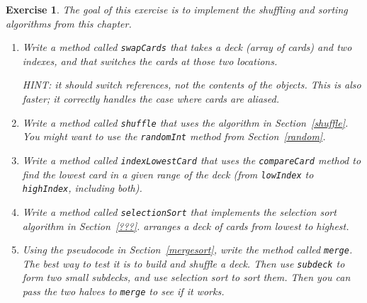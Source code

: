 \documentclass[12pt]{book}
\theoremstyle{exercise}
\newtheorem{exercise}{Exercise}[chapter]
\newcommand{\java}[1]{\verb"#1"}
\newcommand{\java}[1]{\lstinline{#1}} %
\begin{document}
\begin{exercise}
The goal of this exercise is to implement the shuffling and sorting algorithms from this chapter.

\begin{enumerate}




\item Write a method called \java{swapCards} that takes a deck (array of cards) and two indexes, and that switches the cards at those two locations.

HINT: it should switch references, not the contents of the objects.
This is also faster; it correctly handles the case where cards are aliased.

\item Write a method called \java{shuffle} that uses the algorithm in Section~\ref{shuffle}.
You might want to use the \java{randomInt} method from Section~\ref{random}.

\item Write a method called \java{indexLowestCard} that uses the \java{compareCard} method to find the lowest card in a given range of the deck (from \java{lowIndex} to \java{highIndex}, including both).

\item Write a method called \java{selectionSort} that implements the selection sort algorithm in Section~\ref{???}.
arranges a deck of cards from lowest to highest.

\item Using the pseudocode in Section~\ref{mergesort}, write the method called \java{merge}.
The best way to test it is to build and shuffle a deck.
Then use \java{subdeck} to form two small subdecks, and use selection sort to sort them.
Then you can pass the two halves to \java{merge} to see if it works.


\end{enumerate}
\end{exercise}
\end{document}
